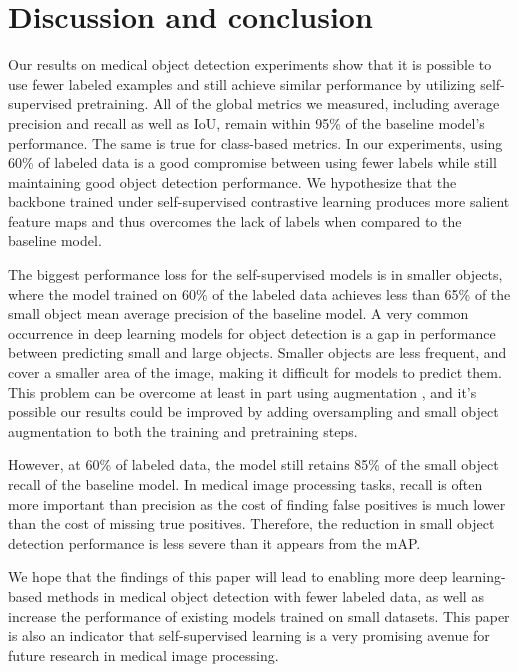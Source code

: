 \documentclass[conference]{IEEEtran}
\begin{document}
\section{Discussion and conclusion}\label{sec12}

Our results on medical object detection experiments show that it is possible to use fewer labeled 
examples and still achieve similar performance by utilizing self-supervised 
pretraining. All of the global metrics we measured, including average precision and recall as well 
as IoU, remain within 95\% of the baseline model's performance. The same is true for class-based 
metrics. In our experiments, using 60\% of labeled data is a good compromise between using fewer 
labels while still maintaining good object detection performance. We hypothesize that the 
backbone trained under self-supervised contrastive learning produces more salient feature maps and 
thus overcomes the lack of labels when compared to the baseline model. 

The biggest performance loss for the self-supervised models is in smaller objects, where the model 
trained on 60\% of the labeled data achieves less than 65\% of the small object mean average 
precision of the baseline model. A very common occurrence in deep learning models for 
object detection is a gap in performance between predicting small and large objects. Smaller objects 
are less frequent, and cover a smaller area of the image, making it difficult for models to predict 
them. This problem can be overcome at least in part using augmentation 
\cite{kisantalAugmentationSmallObject2019}, and it's possible our results could be improved by 
adding oversampling and small object augmentation to both the training and pretraining steps.

However, at 60\% of labeled data, the model still retains 85\% of the small object recall of the baseline model.
In medical image processing tasks, recall is often more important than precision as the cost of finding false positives
is much lower than the cost of missing true positives. Therefore, the reduction in small object detection performance
is less severe than it appears from the mAP.

We hope that the findings of this paper will lead to enabling more deep learning-based methods in 
medical object detection with fewer labeled data, as well as increase the performance of existing 
models trained on small datasets. This paper is also an indicator that self-supervised learning is 
a very promising avenue for future research in medical image processing.


\end{document}

